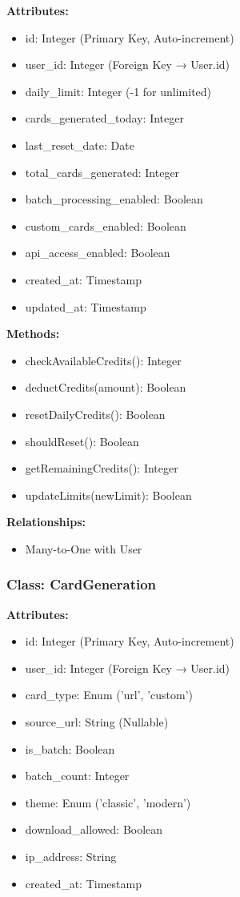 \documentclass[12pt,a4paper]{article}
\begin{document}
\textbf{Attributes:}
\begin{itemize}
    \item id: Integer (Primary Key, Auto-increment)
    \item user\_id: Integer (Foreign Key → User.id)
    \item daily\_limit: Integer (-1 for unlimited)
    \item cards\_generated\_today: Integer
    \item last\_reset\_date: Date
    \item total\_cards\_generated: Integer
    \item batch\_processing\_enabled: Boolean
    \item custom\_cards\_enabled: Boolean
    \item api\_access\_enabled: Boolean
    \item created\_at: Timestamp
    \item updated\_at: Timestamp
\end{itemize}

\textbf{Methods:}
\begin{itemize}
    \item checkAvailableCredits(): Integer
    \item deductCredits(amount): Boolean
    \item resetDailyCredits(): Boolean
    \item shouldReset(): Boolean
    \item getRemainingCredits(): Integer
    \item updateLimits(newLimit): Boolean
\end{itemize}

\textbf{Relationships:}
\begin{itemize}
    \item Many-to-One with User
\end{itemize}

\subsubsection{Class: CardGeneration}

\textbf{Attributes:}
\begin{itemize}
    \item id: Integer (Primary Key, Auto-increment)
    \item user\_id: Integer (Foreign Key → User.id)
    \item card\_type: Enum ('url', 'custom')
    \item source\_url: String (Nullable)
    \item is\_batch: Boolean
    \item batch\_count: Integer
    \item theme: Enum ('classic', 'modern')
    \item download\_allowed: Boolean
    \item ip\_address: String
    \item created\_at: Timestamp
\end{itemize}
\end{document}
